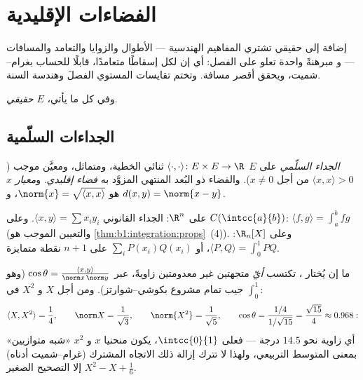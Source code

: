 \chapter{الفضاءات الإقليدية}\label{ch:b1:euclid}

إضافة  إلى  حقيقي تشتري المفاهيم
الهندسية --- الأطوال والزوايا والتعامد والمسافات --- و
مبرهنةً واحدة تعلو على الفصل: أي إن لكل 
إسقاطًا متعامدًا، قابلًا للحساب بغرام--شميت، ويحقق
أقصر مسافة. وتختم تقايسات المستوي الفصلَ وهندسة
السنة.

وفي كل ما يأتي، $E$  \emph{حقيقي}.

\section{الجداءات السلّمية}

\begin{definition}\label{def:b1:euclid:def}
\emph{الجداء السلّمي} على $E$ 
$\langle\cdot,\cdot\rangle \colon E \times E \to \R$ ثنائي الخطية، ومتماثل، ومعيَّن موجب ($\langle x, x\rangle >
0$ من أجل $x \neq 0$). والفضاء ذو البُعد المنتهي المزوَّد به
\emph{فضاء إقليدي}. و\emph{معيار}
$x$ هو $\norm{x} = \sqrt{\langle x, x\rangle}$، و $d(x, y) =
\norm{x - y}$.
\end{definition}

\begin{example}\label{ex:b1:euclid:examples}
على $\R^n$: الجداء القانوني $\langle x, y\rangle = \sum x_i
y_i$. وعلى $C(\intcc{a}{b})$: $\langle f, g \rangle = \int_a^b fg$
(والتعيين الموجب هو \cref{thm:b1:integration:props}~(4)). وعلى
$\R_n[X]$: $\langle P, Q\rangle = \int_0^1 PQ$، أو $\sum_{i}
P(x_i)Q(x_i)$ على $n+1$ نقطة متمايزة.
\end{example}

\begin{example}
\label{ex:b1:euclid:polyangle}
ما إن يُختار ، تكتسب \emph{أيّ} متجهتين غير معدومتين
زاويةً، عبر $\cos\theta = \frac{\langle x,
y\rangle}{\norm x\,\norm y}$ (وهو جيب تمام مشروع
بكوشي--شوارتز). ومن أجل $X$ و $X^2$ في $\int_0^1$:
\[
\langle X, X^2\rangle = \frac14, \qquad
\norm X = \frac1{\sqrt3}, \qquad \norm{X^2} = \frac1{\sqrt5},
\qquad
\cos\theta = \frac{1/4}{1/\sqrt{15}} = \frac{\sqrt{15}}{4}
\approx 0.968 :
\]
أي زاوية نحو $14.5$ درجة --- فعلى $\intcc{0}{1}$، يكون
منحنيا $x$ و $x^2$ «شبه متوازيين» بمعنى
المتوسط التربيعي، ولهذا لا تترك إزالة ذلك الاتجاه
المشترك (غرام--شميت أدناه) إلا التصحيح
الصغير $X^2 - X + \frac16$.
\end{example}

